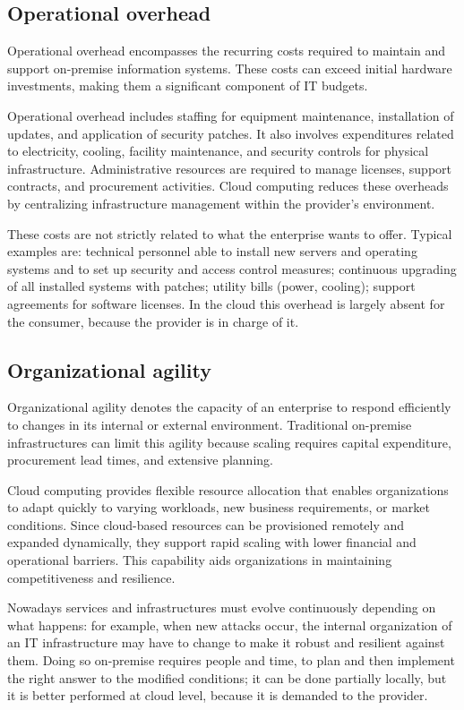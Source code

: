 \subsection{Operational overhead}

Operational overhead encompasses the recurring costs required to maintain and support on-premise information systems. These costs can exceed initial hardware investments, making them a significant component of IT budgets.

Operational overhead includes staffing for equipment maintenance, installation of updates, and application of security patches. It also involves expenditures related to electricity, cooling, facility maintenance, and security controls for physical infrastructure. Administrative resources are required to manage licenses, support contracts, and procurement activities. Cloud computing reduces these overheads by centralizing infrastructure management within the provider's environment.

These costs are not strictly related to what the enterprise wants to offer. Typical examples are: technical personnel able to install new servers and operating systems and to set up security and access control measures; continuous upgrading of all installed systems with patches; utility bills (power, cooling); support agreements for software licenses. In the cloud this overhead is largely absent for the consumer, because the provider is in charge of it.

\subsection{Organizational agility}

Organizational agility denotes the capacity of an enterprise to respond efficiently to changes in its internal or external environment. Traditional on-premise infrastructures can limit this agility because scaling requires capital expenditure, procurement lead times, and extensive planning.

Cloud computing provides flexible resource allocation that enables organizations to adapt quickly to varying workloads, new business requirements, or market conditions. Since cloud-based resources can be provisioned remotely and expanded dynamically, they support rapid scaling with lower financial and operational barriers. This capability aids organizations in maintaining competitiveness and resilience.

Nowadays services and infrastructures must evolve continuously depending on what happens: for example, when new attacks occur, the internal organization of an IT infrastructure may have to change to make it robust and resilient against them. Doing so on-premise requires people and time, to plan and then implement the right answer to the modified conditions; it can be done partially locally, but it is better performed at cloud level, because it is demanded to the provider.

